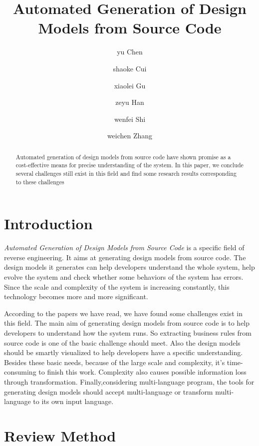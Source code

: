 \documentclass[acmsmall]{acmart}
\begin{document}
\title{Automated Generation of Design Models from Source Code}


\author{yu Chen}
\author{shaoke Cui}
\author{xiaolei Gu}
\author{zeyu Han}
\author{wenfei Shi}
\author{weichen Zhang}


\begin{abstract}
Automated generation of design models from source code have shown promise as a cost-effective means for precise understanding of the system. In this paper, we conclude several challenges still exist in this field and find some research results corresponding to these challenges
\end{abstract}


\maketitle

\section{Introduction}
{\itshape Automated Generation of Design Models from Source Code} is a specific field of reverse engineering. It aims at generating design models from source code. The design models it generates can help developers understand the whole system, help evolve the system and check whether some behaviors of the system has errors. Since the scale and complexity of the system is increasing constantly, this technology becomes more and more significant.


According to the papers we have read, we have found some challenges exist in this field. The main aim of generating design models from source code is to help developers to understand how the system runs. So extracting business rules from source code is one of the basic challenge should meet. Also the design models should be smartly visualized to help developers have a specific understanding. Besides these basic needs, because of the large scale and complexity, it's time-consuming to finish this work. Complexity also causes possible information loss through transformation. Finally,considering multi-language program, the tools for generating design models should accept multi-language or transform multi-language to its own input language.

\section{Review Method}
\end{document}
